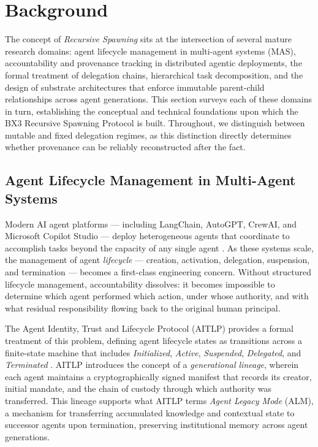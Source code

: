 \section{Background}

The concept of \emph{Recursive Spawning} sits at the intersection of several mature research domains: agent lifecycle management in multi-agent systems (MAS), accountability and provenance tracking in distributed agentic deployments, the formal treatment of delegation chains, hierarchical task decomposition, and the design of substrate architectures that enforce immutable parent-child relationships across agent generations. This section surveys each of these domains in turn, establishing the conceptual and technical foundations upon which the BX3 Recursive Spawning Protocol is built. Throughout, we distinguish between mutable and fixed delegation regimes, as this distinction directly determines whether provenance can be reliably reconstructed after the fact.

\subsection{Agent Lifecycle Management in Multi-Agent Systems}

Modern AI agent platforms — including LangChain, AutoGPT, CrewAI, and Microsoft Copilot Studio — deploy heterogeneous agents that coordinate to accomplish tasks beyond the capacity of any single agent \citep{arnautovic2025identity, larsson2025aitlp}. As these systems scale, the management of agent \emph{lifecycle} — creation, activation, delegation, suspension, and termination — becomes a first-class engineering concern. Without structured lifecycle management, accountability dissolves: it becomes impossible to determine which agent performed which action, under whose authority, and with what residual responsibility flowing back to the original human principal.

The Agent Identity, Trust and Lifecycle Protocol (AITLP) provides a formal treatment of this problem, defining agent lifecycle states as transitions across a finite-state machine that includes \emph{Initialized}, \emph{Active}, \emph{Suspended}, \emph{Delegated}, and \emph{Terminated} \citep{larsson2025aitlp}. AITLP introduces the concept of a \emph{generational lineage}, wherein each agent maintains a cryptographically signed manifest that records its creator, initial mandate, and the chain of custody through which authority was transferred. This lineage supports what AITLP terms \emph{Agent Legacy Mode} (ALM), a mechanism for transferring accumulated knowledge and contextual state to successor agents upon termination, preserving institutional memory across agent generations.

